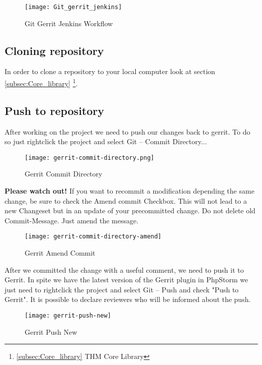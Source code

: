 \begin{figure}[H] 
	\centering
	\vspace{3pt}
	\texttt{[image: Git\_gerrit\_jenkins]}
	\caption{Git Gerrit Jenkins Workflow}
\end{figure}


\subsection{Cloning repository}
In order to clone a repository to your local computer look at section \ref{subsec:Core_library} \footnote{\ref{subsec:Core_library} THM Core Library}.

\subsection{Push to repository} 
After working on the project we need to push our changes back to gerrit. To do so just rightclick the project and select Git -- Commit Directory...

\begin{figure}[H] 
	\centering
	\vspace{3pt}
	\texttt{[image: gerrit-commit-directory.png]}
	\caption{Gerrit Commit Directory}
\end{figure}

\textbf{Please watch out!} If you want to recommit a modification depending the same change, be sure to check the Amend commit Checkbox. This will not lead to a new Changeset but in an update of your precommitted change. Do not delete old Commit-Message. Just amend the message.

\begin{figure}[H] 
	\centering
	\vspace{3pt}
	\texttt{[image: gerrit-commit-directory-amend]}
	\caption{Gerrit Amend Commit}
\end{figure}

After we committed the change with a useful comment, we need to push it to Gerrit. In spite we have the latest version of the Gerrit plugin in PhpStorm we just need to rightclick the project and select Git -- Push and check "Push to Gerrit". It is possible to declare reviewers who will be informed about the push.

\begin{figure}[H] 
	\centering
	\vspace{3pt}
	\texttt{[image: gerrit-push-new]}
	\caption{Gerrit Push New}
\end{figure}

